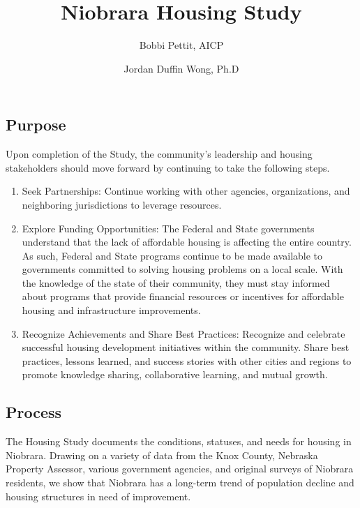 \documentclass[
  letterpaper,
  DIV=11,
  numbers=noendperiod]{scrartcl}
\title{Niobrara Housing Study}
\author{Bobbi Pettit, AICP \and Jordan Duffin Wong, Ph.D}
\date{}
\providecommand{\tightlist}{%
  \setlength{\itemsep}{0pt}\setlength{\parskip}{0pt}}
\begin{document}
\maketitle


\subsection*{Purpose}\label{purpose}

Upon completion of the Study, the community's leadership and housing
stakeholders should move forward by continuing to take the following
steps.

\begin{enumerate}
\def\labelenumi{(\arabic{enumi})}
\tightlist
\item
  Seek Partnerships: Continue working with other agencies,
  organizations, and neighboring jurisdictions to leverage resources.
\item
  Explore Funding Opportunities: The Federal and State governments
  understand that the lack of affordable housing is affecting the entire
  country. As such, Federal and State programs continue to be made
  available to governments committed to solving housing problems on a
  local scale. With the knowledge of the state of their community, they
  must stay informed about programs that provide financial resources or
  incentives for affordable housing and infrastructure improvements.
\item
  Recognize Achievements and Share Best Practices: Recognize and
  celebrate successful housing development initiatives within the
  community. Share best practices, lessons learned, and success stories
  with other cities and regions to promote knowledge sharing,
  collaborative learning, and mutual growth.
\end{enumerate}

\subsection*{Process}\label{process}

The Housing Study documents the conditions, statuses, and needs for
housing in Niobrara. Drawing on a variety of data from the Knox County,
Nebraska Property Assessor, various government agencies, and original
surveys of Niobrara residents, we show that Niobrara has a long-term
trend of population decline and housing structures in need of
improvement.
\end{document}
